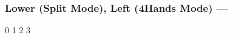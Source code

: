 \subsubsection[Lower/Left (Split/4Hands)]{Lower (Split Mode), Left (4Hands  Mode) --- \UiKey{\SET}}









































0
1
2
3
